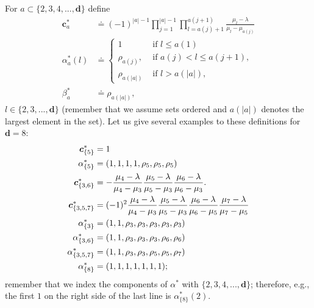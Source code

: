 \documentclass[11pt,a4paper]{article}
\begin{document}
For $a \subset \{2,3,4,...,{\bm d}\}$ define
\begin{align}\label{e:solutiontandem}
{\boldsymbol c}^*_{a} &\doteq (-1)^{|a|-1} \prod_{j=1}^{|a|-1} \prod_{l = a(j) + 1}^{a(j+1)}
\frac{\mu_l - \lambda}{\mu_l-\mu_{a(j)}}\\
\alpha^*_{a}(l) &\doteq
\begin{cases}
	1 &\text{ if } l \le a(1)\\
	\rho_{a(j)}, &\text{ if } a(j) < l \le a(j+1),\\
	\rho_{a(|a|)} & \text{ if } l > a(|a|),
\end{cases}
\label{e:defalphastar}\\
\beta^*_{a}&\doteq \rho_{a(|a|)}, \label{e:defbetastar}
\end{align}
$l \in \{2,3,...,{\bm d}\}$ (remember that we assume sets ordered
and $a(|a|)$ denotes
the largest element in the set). Let us give several examples to these
definitions for ${\boldsymbol d} = 8$:
\begin{align}\label{e:examplescstaralphastar}
{\boldsymbol c}^*_{\{5\}}&= 1\notag \\
\alpha^*_{\{5\}} &= (1,1,1,1,\rho_5,\rho_5,\rho_5)\notag \\
{\boldsymbol c}^*_{\{3,6\}} &= - \frac{ \mu_4 -\lambda}{\mu_4 - \mu_3} \frac{\mu_5 -
\lambda}{\mu_5-\mu_3} \frac{\mu_6-\lambda}{\mu_6-\mu_3}.\notag \\
{\boldsymbol c}^*_{\{3,5,7\}} &
= (-1)^2 \frac{\mu_4 - \lambda}{\mu_4 -\mu_3} \frac{\mu_5-\lambda}{\mu_5-\mu_3}
\frac{\mu_6-\lambda}{\mu_6-\mu_5} \frac{\mu_7-\lambda}{\mu_7-\mu_5}\notag \\
\alpha^*_{\{3\}} &= (1,1,\rho_3,\rho_3,\rho_3,\rho_3,\rho_3)\\
\alpha^*_{\{3,6\}} &= (1,1,\rho_3,\rho_3,\rho_3,\rho_6,\rho_6)\notag \\
\alpha^*_{\{3,5,7\}} &= (1,1,\rho_3,\rho_3,\rho_5,\rho_5,\rho_7)\notag \\
\alpha^*_{\{8\}} &= (1,1,1,1,1,1,1);\notag
\end{align}
remember that we index the components of $\alpha^*$ with 
$\{2,3,4,...,{\bm d}\}$; therefore,
e.g., the first $1$ on the right side of the last line is $\alpha^*_{\{8\}}(2).$
\end{document}
